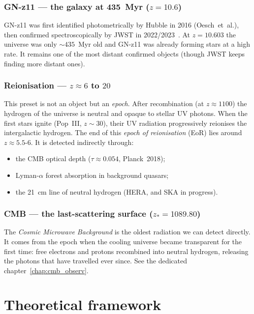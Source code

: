 \documentclass[11pt,a4paper,openany]{report}
\begin{document}
\section{GN-z11 --- the galaxy at 435~Myr ($z = 10.6$)}

GN-z11 was first identified photometrically by Hubble in 2016 (Oesch~et~al.),
then confirmed spectroscopically by JWST in 2022/2023~\cite{Bunker2023}. At
$z = 10.603$ the universe was only $\sim 435$~Myr old and GN-z11 was already
forming stars at a high rate. It remains one of the most distant confirmed
objects (though JWST keeps finding more distant ones).

\section{Reionisation --- $z \approx 6$ to $20$}

This preset is not an object but an \emph{epoch}. After recombination (at
$z \approx 1100$) the hydrogen of the universe is neutral and opaque to stellar
UV photons. When the first stars ignite (Pop~III, $z \sim 30$), their UV
radiation progressively reionises the intergalactic hydrogen. The end of this
\emph{epoch of reionisation} (EoR) lies around $z \approx 5.5\text{-}6$. It is
detected indirectly through:
\begin{itemize}[topsep=2pt]
\item the CMB optical depth ($\tau \approx 0.054$, Planck~2018);
\item Lyman-$\alpha$ forest absorption in background quasars;
\item the 21~cm line of neutral hydrogen (HERA, and SKA in progress).
\end{itemize}

\section{CMB --- the last-scattering surface ($z_{*} = 1089.80$)}

The \emph{Cosmic Microwave Background} is the oldest radiation we can detect
directly. It comes from the epoch when the cooling universe became transparent
for the first time: free electrons and protons recombined into neutral
hydrogen, releasing the photons that have travelled ever since. See the
dedicated chapter~\ref{chap:cmb_observ}.

\clearpage

\part{Theoretical framework}
\end{document}
